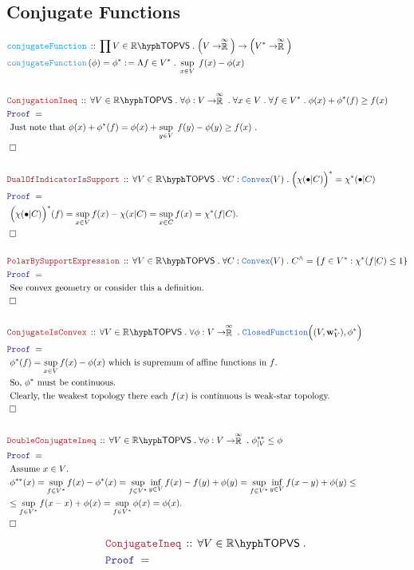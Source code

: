 \documentclass[12pt]{scrartcl}
\newcommand{\TYPE}[1]{\textcolor{NavyBlue}{\mathtt{#1}}}
\newcommand{\FUNC}[1]{\textcolor{Cerulean}{\mathtt{#1}}}
\newcommand{\LOGIC}[1]{\textcolor{Blue}{\mathtt{#1}}}
\newcommand{\THM}[1]{\textcolor{Maroon}{\mathtt{#1}}}
\renewcommand{\.}{\; . \;}
\newcommand{\de}{: \kern 0.1pc =}
\newcommand{\Act}[1]{\left( #1 \right)}
\newcommand{\Theorem}[2]{& \THM{#1} \, :: \, #2 \\ & \Proof = \\ }
\newcommand{\DeclareFunc}[2]{& \FUNC{#1} \, :: \, #2 \\}
\newcommand{\DefineNamedFunc}[4]{&  \FUNC{#1}\Act{#2} = #3 \de #4 \\}
\newcommand{\Page}[1]{ \begin{align*} #1 \end{align*}   }
\newcommand{\Reals}{\mathbb{R} }
\newcommand{\EReals}{\stackrel{\mathclap{\infty}}{\mathbb{R}}}
\newcommand{\QED}{\; \square}
\newcommand{\EndProof}{& \QED \\}
\newcommand{\Proof}{\LOGIC{Proof} \; }
\newcommand{\Explain}[1]{& \text{#1.} \\}
\newcommand{\ExplainFurther}[1]{& \text{#1} \\}
\newcommand{\TOPVS}[1]{#1\hyph\mathsf{TOPVS}} %
\newcommand{\Convex}{\TYPE{Convex}}
\newcommand{\ClF}{\TYPE{ClosedFunction}}
\begin{document}
\subsection{Conjugate Functions}
\Page{
			\DeclareFunc{conjugateFunction}
			{
				\prod V \in \TOPVS{\Reals}  \.
				\Big(V \to \EReals\Big) \to \Big(V^* \to \EReals\Big)
			}
			\DefineNamedFunc{conjugateFunction}{\phi}{\phi^*}
			{
				\Lambda f \in V^* \. \sup_{x \in V} \; f(x) - \phi(x)			
			}
			\\
			\Theorem{ConjugationIneq}
			{
				\forall V \in \TOPVS{\Reals} \.
				\forall \phi : V \to \EReals \.
				\forall x \in V \.
				\forall f \in V^* \.
				\phi(x) + \phi^*(f) \ge  f(x)   
			}
			\Explain{
				Just note that
				$\phi(x) + \phi^*(f) = \phi(x) + \sup_{y \in V} \; f(y) - \phi(y) \ge f(x)$
			}
			\EndProof
			\\
			\Theorem{DualOfIndicatorIsSupport}
			{
				\forall V \in \TOPVS{\Reals} \.
				\forall C : \Convex(V) \.
				\Big(\chi(\bullet|C) \Big)^* = \chi^*(\bullet|C)
			}
			\Explain{
				$
				\Big(\chi(\bullet|C) \Big)^*(f) =   
				\sup_{x \in V}  f(x)  -  \chi(x|C) =
				\sup_{x \in C} f(x) =  \chi^*(f|C)$}
			\EndProof
			\\
			\Theorem{PolarBySupportExpression}
			{
				\forall V \in \TOPVS{\Reals} \.
				\forall C  : \Convex(V) \.
				C^{\wedge} = \{ f \in V^* : \chi^*(f|C) \le 1   \}
			}
			\Explain{
				See convex geometry or consider this a definition}
			\EndProof
			\\
			\Theorem{ConjugateIsConvex}
			{
				\forall V \in \TOPVS{\Reals} \.
				\forall \phi : V \to \EReals \.
				\ClF\Big((V,\mathbf{w}_V^*),\phi^*\Big)				 
			}
			\Explain{
				$\phi^*(f) = \sup_{x \in V} f(x) - \phi(x)$ which is supremum of affine functions in $f$}
			\Explain{
				So, $\phi^*$ must be continuous}
			\Explain{
				Clearly, the weakest topology there each $f(x)$ is continuous is weak-star topology}
			\EndProof
			\\
			\Theorem{DoubleConjugateIneq}
			{
				\forall V \in \TOPVS{\Reals} \.
				\forall \phi : V \to \EReals \.
				\phi^{**}_{|V} \le \phi
			}
			\Explain{
				Assume $x \in V$}
			\ExplainFurther{
				$
					\phi^{**}(x) = 
					\sup_{f \in V^*} f(x)  - \phi^*(x) =
					\sup_{f \in V^*} \inf_{y \in V} f(x) - f(y) + \phi(y) =
					\sup_{f \in V^*} \inf_{y \in V} f(x - y) + \phi(y) \le $}
			\Explain{ 
				$ \le 
					\sup_{f \in V^*} f(x - x) + \phi(x) = 
					\sup_{f \in V^*} \phi(x) = \phi(x) 
				$}
			\EndProof
}\Page{
		\Theorem{ConjugateIneq}
		{
			\forall V \in \TOPVS{\Reals} \.
}}
\end{document}
